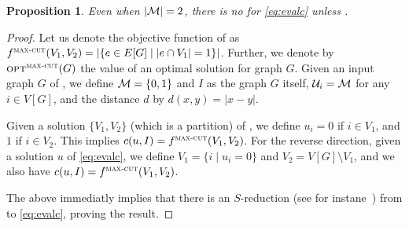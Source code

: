 \documentclass[12pt]{article}
\newtheorem{proposition}{Proposition}
\begin{document}
\begin{proposition}\label{prop:maxcut}
Even when $|\mathcal{M}|=2$, there is no \PTAS for \ref{eq:evalc} unless \PEQNP.
\end{proposition}
\begin{proof}
Let us denote the objective function of \MAXCUT as $f^{\textsc{max-cut}}(V_1,V_2)=|\{e \in E[G]\mid |e \cap V_1|=1\}|$. Further, we denote by $\mbox{\textsc{opt}}^{\textsc{max-cut}}(G)$ the value of an optimal solution for graph $G$. Given an input graph $G$ of \MAXCUT, we define $\mathcal{M}=\{0,1\}$ and $I$ as the graph $G$ itself, $\mathcal{U}_i = \mathcal{M}$ for any $i \in V[G]$, and the distance $d$ by $d(x,y)=|x-y|$.

Given a solution $\{V_1,V_2\}$ (which is a partition) of \MAXCUT, we define $u_i = 0$ if $i \in V_1$, and $1$ if $i \in V_2$. This implies $c(u,I) = f^{\textsc{max-cut}}(V_1,V_2)$. For the reverse direction, given a solution $u$ of \ref{eq:evalc}, we define $V_1 = \{i \mid u_i=0\}$ and $V_2 = V[G] \setminus V_1$, and we also have $c(u,I) = f^{\textsc{max-cut}}(V_1,V_2)$.

The above immediatly implies that there is an $S$-reduction (see for instane~\cite{612321}) from \MAXCUT to \ref{eq:evalc}, proving the result.
\end{proof}

%  
\end{document}
